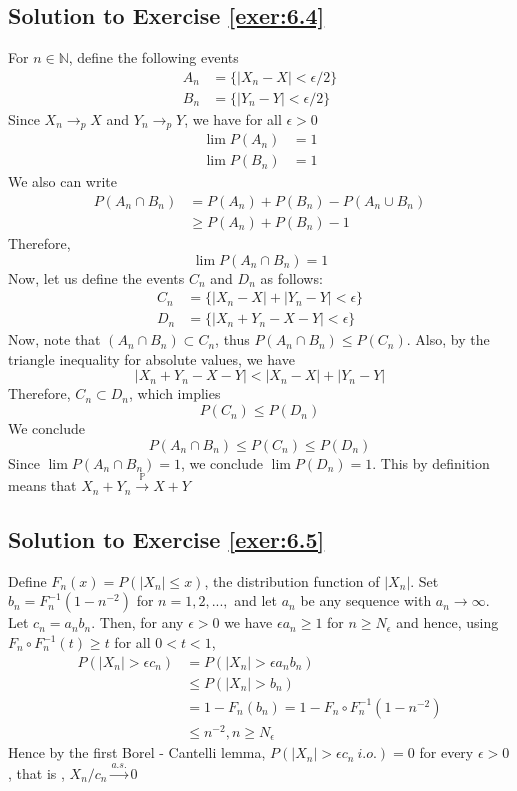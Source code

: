 \documentclass[12pt]{book}
\numberwithin{equation}{chapter}
\theoremstyle{plain}
\numberwithin{theorem}{section}
\theoremstyle{definition}
\numberwithin{exercise}{chapter}
\newcommand{\<}{\langle}
\renewcommand{\>}{\rangle}
\renewcommand{\(}{\left(}
\renewcommand{\)}{\right)}
\renewcommand{\[}{\left[}
\renewcommand{\]}{\right]}
\newcommand\Pb{\mathds{P}}
\newcommand\Nb{\mathds{N}}
\begin{document}
\subsection*{Solution to Exercise \ref{exer:6.4}}
For $n \in \Nb$, define the following events 
\begin{align}
 A_n &=\{ |X_n - X| < \epsilon/2   \}\\
 B_n &=\{ |Y_n - Y| < \epsilon/2   \}
\end{align}
Since $X_n \rightarrow_p X$ and $Y_n \rightarrow_{p} Y$, we have for all $\epsilon > 0$
\begin{align}
 \lim P(A_n) &= 1\\
 \lim P(B_n) &= 1
\end{align}
We also can write 
\begin{align}
 P(A_n \cap B_n) &= P(A_n) + P(B_n) - P(A_n \cup B_n)\\
                          & \geq P(A_n) + P(B_n) - 1
\end{align}
Therefore,
 $$\lim P(A_n \cap B_n) = 1 $$
 Now, let us define the events $C_n$ and $D_n$ as follows:
 \begin{align}
 C_n &= \{  |X_n - X| + |Y_n - Y| < \epsilon  \}\\
 D_n &= \{  |X_n + Y_n - X  - Y| < \epsilon   \} 
  \end{align}
  Now, note that $(A_n \cap B_n) \subset C_n$, thus $P(A_n \cap B_n) \leq P(C_n)$. Also, by the triangle inequality for absolute values, we have 
  $$ 	|X_n + Y_n - X  - Y| < |X_n - X| + |Y_n - Y|   $$
Therefore, $C_n \subset D_n$, which implies
$$P(C_n) \leq P(D_n)$$
We conclude 
$$P(A_n \cap B_n) \leq P(C_n) \leq P(D_n) $$
Since $\lim P(A_n \cap B_n) =1$, we conclude $\lim P(D_n)=1$. This by definition means that $X_n + Y_n  \stackrel{\Pb}{\rightarrow} X+Y$ 

\subsection*{Solution to Exercise \ref{exer:6.5}}
Define $F_n(x) = P(|X_n| \leq x)$, the distribution function of $|X_n|$. Set $b_n = F_n^{-1}(1 - n^{-2})$ for $n=1,2, . . .,$ and let ${a_n}$ be any sequence with $a_n \rightarrow \infty$. Let $c_n = a_nb_n$. Then, for any $\epsilon > 0$ we have $\epsilon a_n \geq 1$ for $n \geq N_{\epsilon}$ and hence, using $F_n \circ F_n^{-1}(t) \geq t$ for all $0 < t< 1$, 
\begin{align}
P(|X_n| > \epsilon c_n) 
    &= P(|X_n| > \epsilon a_n b_n)\\
	&\leq P(|X_n| > b_n)\\
	&= 1 - F_n(b_n) = 1 - F_n \circ F_n^{-1}(1 - n ^{-2})\\
	&\leq n^{-2}, n \geq N_{\epsilon}
\end{align}
Hence by the first Borel - Cantelli lemma, $P(|X_n| > \epsilon c_n \ i.o.) = 0$ for every $\epsilon > 0 $, that is , $X_n/c_n \stackrel{a.s.}{\rightarrow} 0 $ 
\end{document}
